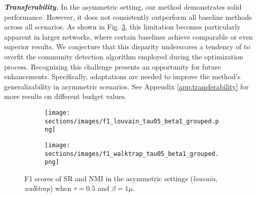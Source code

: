 \textbf{\textit{Transferability.}}
In the asymmetric setting, our method demonstrates solid performance. However, it does not consistently outperform all baseline methods across all scenarios. As shown in Fig. \ref{fig:f1-asymmetric}, this limitation becomes particularly apparent in larger networks, where certain baselines achieve comparable or even superior results. We conjecture that this disparity underscores a tendency of \method{} to overfit the community detection algorithm employed during the optimization process. Recognizing this challenge presents an opportunity for future enhancements. Specifically, adaptations are needed to improve the method's generalizability in asymmetric scenarios. See Appendix \ref{app:transferability} for more results on different budget values.

\begin{figure}[htpb]
    \centering
    \begin{subfigure}{\linewidth}
        \centering
        \texttt{[image: sections/images/f1\_louvain\_tau05\_beta1\_grouped.png]}
        \label{fig:f1-louv}
    \end{subfigure}
    \vspace{5mm} %
    \begin{subfigure}{\linewidth}
        \centering
        \texttt{[image: sections/images/f1\_walktrap\_tau05\_beta1\_grouped.png]}
        \label{fig:f1-walk}
    \end{subfigure}
    \vspace{-10mm}
    \caption{F1 scores of SR and NMI in the asymmetric settings (\textit{louvain}, \textit{walktrap}) when $\tau=0.5$ and $\beta=1\mu$.}
    \label{fig:f1-asymmetric}
    \vspace{-3mm}
\end{figure}


